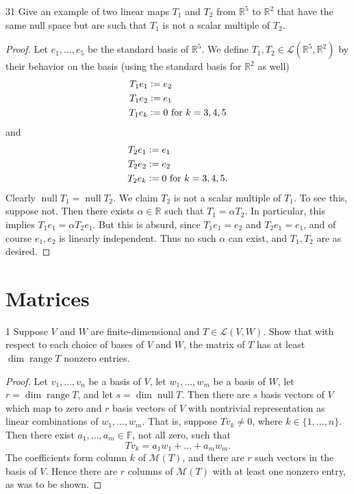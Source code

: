 \documentclass{extarticle}
\newenvironment{problem}[1]{\begin{prob*}{#1}{}}{\end{prob*}}
\newcommand{\R}{\mathbb{R}}
\newcommand{\F}{\mathbb{F}}
\newcommand{\mat}{\mathcal{M}}
\newcommand{\Hom}{\mathcal{L}}
\DeclareMathOperator{\Null}{null}
\DeclareMathOperator{\Range}{range}
\newcommand{\defeq}{\vcentcolon=}
\begin{document}
\begin{problem}{31}
Give an example of two linear maps $T_1$ and $T_2$ from $\R^5$ to $\R^2$ that have the same null space but are such that $T_1$ is not a scalar multiple of $T_2$.  
\end{problem}
\begin{proof}
Let $e_1,\dots, e_5$ be the standard basis of $\R^5$.  We define $T_1,T_2\in\Hom(\R^5,\R^2)$ by their behavior on the basis (using the standard basis for $\R^2$ as well)
\begin{align*}
T_1e_1 &\defeq e_2\\
T_1e_2 &\defeq e_1\\
T_1e_k &\defeq 0 \text{ for }k = 3, 4, 5
\end{align*} 
and 
\begin{align*}
T_2e_1 &\defeq e_1\\
T_2e_2 &\defeq e_2\\
T_2e_k &\defeq 0 \text{ for }k = 3, 4, 5.
\end{align*}
Clearly $\Null T_1 = \Null T_2$.  We claim $T_2$ is not a scalar multiple of $T_1$.  To see this, suppose not.  Then there exists $\alpha\in\R$ such that $T_1 = \alpha T_2$.  In particular, this implies $T_1e_1 = \alpha T_2e_1$.  But this is absurd, since $T_1e_1 = e_2$ and $T_2e_1 = e_1$, and of course $e_1,e_2$ is linearly independent.  Thus no such $\alpha$ can exist, and $T_1,T_2$ are as desired.
\end{proof}


\section{Matrices}

\begin{problem}{1}
Suppose $V$ and $W$ are finite-dimensional and $T\in\Hom(V,W)$.  Show that with respect to each choice of bases of $V$ and $W$, the matrix of $T$ has at least $\dim\Range T$ nonzero entries.
\end{problem}
\begin{proof}
Let $v_1,\dots, v_n$ be a basis of $V$, let $w_1,\dots, w_m$ be a basis of $W$, let $r = \dim\Range T$, and let $s = \dim\Null T$.  Then there are $s$ basis vectors of $V$ which map to zero and $r$ basis vectors of $V$ with nontrivial representation as linear combinations of $w_1,\dots, w_m$.  That is, suppose $Tv_k\neq 0$, where $k\in\{1,\dots, n\}$. Then there exist $a_1,\dots, a_m\in\F$, not all zero, such that
\begin{equation*}
Tv_k = a_1w_1 + \dots + a_mw_m.
\end{equation*}
The coefficients form column $k$ of $\mat(T)$, and there are $r$ such vectors in the basis of $V$.  Hence there are $r$ columns of $\mat(T)$ with at least one nonzero entry, as was to be shown. 
\end{proof}
\end{document}
